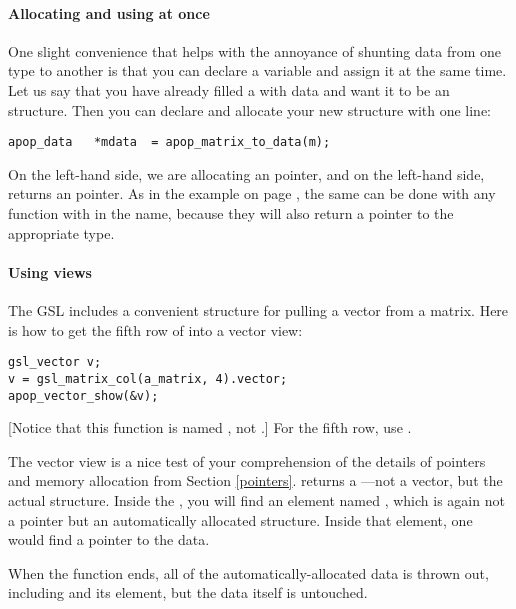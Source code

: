 \paragraph{Allocating and using at once}    
One slight convenience that helps with the annoyance of shunting data from
one type to another is that you can declare a variable and assign it at the
same time. Let us say that you have already filled a  with data and want it to be an  structure. Then
you can declare and allocate your new structure with one line:
\begin{lstlisting}
apop_data   *mdata  = apop_matrix_to_data(m);
\end{lstlisting}
On the left-hand side, we are allocating an  pointer, and
on the left-hand side,  returns an 
 pointer. As in the example on page \pageref{gslexample}, the same can be
done with any function with  in the name, because they will also
return a pointer to the appropriate type.

\paragraph{Using views}
The GSL includes a convenient structure for pulling a vector from a
matrix. Here is how to get the fifth row of  into a vector view:

\begin{lstlisting}
gsl_vector v;
v = gsl_matrix_col(a_matrix, 4).vector;
apop_vector_show(&v);
\end{lstlisting}
[Notice that this function is named , not .]
For the fifth row, use . 

The vector view is a nice test of your comprehension of the details of
pointers and memory allocation from Section \ref{pointers}.
 returns a
---not a vector, but the actual
structure.  Inside the , you will find 
an element named , which is again not a pointer but an
automatically allocated structure. Inside that 
element, one would find a pointer to the data.

When the function ends, all of the automatically-allocated data is
thrown out, including  and its
 element, but the data itself is untouched.

